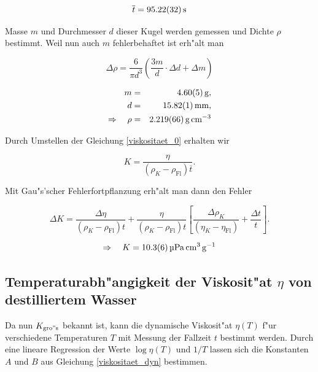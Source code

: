		\begin{equation*}
			\overline{t} = \SI{95.22 (32)}{\second}
		\end{equation*}

		Masse $m$ und Durchmesser $d$ dieser Kugel werden gemessen und Dichte $\rho$ bestimmt.
		Weil nun auch $m$ fehlerbehaftet ist erh"alt man

		\begin{equation*}
			\Delta \rho = \frac{6}{\pi d^3} \left( \frac{3 m}{d} \cdot \Delta d + \Delta m \right)
		\end{equation*}

		\begin{eqnarray*}
				m & = & \SI{4.60 (5)}{\gram} , \\
				d & = & \SI{15.82 (1)}{\milli \meter} , \\
				\Rightarrow \quad \rho & = & \SI{2.219 (66)}{\gram \per \centi \meter \cubed}
		\end{eqnarray*}

		Durch Umstellen der Gleichung \eqref{viskositaet_0} erhalten wir

		\begin{equation}
			K = \frac{\eta}{\left(\rho_K - \rho_\mathrm{Fl}\right) \overline{t}} .
		\end{equation}

		Mit Gau"s'scher Fehlerfortpflanzung erh"alt man dann den Fehler

		\begin{equation*}
			\Delta K = \frac{\Delta \eta}{\left(\rho_K - \rho_\mathrm{Fl}\right) t} + \frac{\eta}{\left(\rho_K - \rho_\mathrm{Fl}\right) t} \left[ \frac{\Delta \rho_K}{\left( \eta_K - \eta_\mathrm{Fl} \right)} + \frac{\Delta t}{t} \right] .
		\end{equation*}

		\begin{equation*}
			\Rightarrow \quad K = \SI{10.3 (6)}{\micro \pascal \centi \meter \cubed \per \gram}
		\end{equation*}

	\subsection{Temperaturabh"angigkeit der Viskosit"at $\eta$ von destilliertem Wasser}
		\label{sub:temperaturabhaengigkeit}

		Da nun $K_\mathrm{gro"s}$ bekannt ist, kann die dynamische Viskosit"at $\eta (T)$ f"ur verschiedene Tem\-pe\-ra\-tu\-ren $T$ mit Messung der Fallzeit $t$ bestimmt werden.
		Durch eine lineare Regression der Werte $\log{\eta (T)}$ und $1 / T$ lassen sich die Konstanten $A$ und $B$ aus Gleichung \eqref{viskositaet_dyn} bestimmen.

